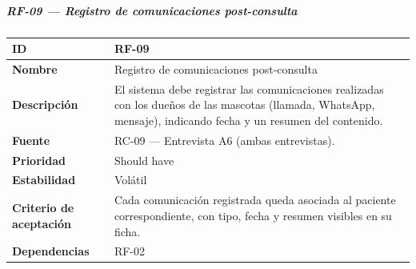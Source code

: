 \subparagraph{RF-09 --- Registro de comunicaciones
post-consulta}\label{rf-09-registro-de-comunicaciones-post-consulta}

{\def\LTcaptype{none} %
\begin{longtable}[]{@{}
  >{\raggedright\arraybackslash}p{}
  >{\raggedright\arraybackslash}p{}@{}}
\toprule\noalign{}
\begin{minipage}[b]{\linewidth}\raggedright
\textbf{ID}
\end{minipage} & \begin{minipage}[b]{\linewidth}\raggedright
RF-09
\end{minipage} \\
\midrule\noalign{}
\endhead
\bottomrule\noalign{}
\endlastfoot
\textbf{Nombre} & \begin{minipage}[t]{\linewidth}\raggedright
Registro de comunicaciones post-consulta
\end{minipage} \\
\textbf{Descripción} & \begin{minipage}[t]{\linewidth}\raggedright
El sistema debe registrar las comunicaciones realizadas con los dueños
de las mascotas (llamada, WhatsApp, mensaje), indicando fecha y un
resumen del contenido.
\end{minipage} \\
\textbf{Fuente} & \begin{minipage}[t]{\linewidth}\raggedright
RC-09 --- Entrevista A6 (ambas entrevistas).
\end{minipage} \\
\textbf{Prioridad} & \begin{minipage}[t]{\linewidth}\raggedright
Should have
\end{minipage} \\
\textbf{Estabilidad} & \begin{minipage}[t]{\linewidth}\raggedright
Volátil
\end{minipage} \\
\textbf{Criterio de aceptación} &
\begin{minipage}[t]{\linewidth}\raggedright
Cada comunicación registrada queda asociada al paciente correspondiente,
con tipo, fecha y resumen visibles en su ficha.
\end{minipage} \\
\textbf{Dependencias} & \begin{minipage}[t]{\linewidth}\raggedright
RF-02
\end{minipage} \\
\end{longtable}
}

